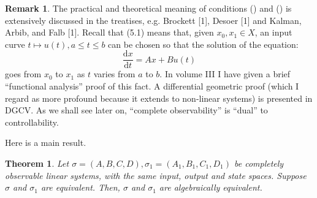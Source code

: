 \documentclass[12pt]{book}
\theoremstyle{plain}
\newtheorem{theorem}{Theorem}[section]
\theoremstyle{definition}
\newtheorem*{remark}{Remark}
\newcommand{\dd}[1]{\mathrm{d}#1}
\begin{document}
\begin{remark}
    The practical and theoretical meaning of conditions () and () is extensively discussed in the treatises, e.g. Brockett [1], Desoer [1] and Kalman, Arbib, and Falb [1]. %
    Recall that (5.1) means that, given $x_0, x_1 \in X$, an input curve $t \mapsto u(t), a \leq t \leq b$ can be chosen so that the solution of the equation: %
    $$\frac{\dd{x}}{\dd{t}} = Ax + Bu(t)$$
    goes from $x_0$ to $x_1$ as $t$ varies from $a$ to $b$.
    In volume III I have given a brief ``functional analysis'' proof of this fact.
    A differential geometric proof (which I regard as more profound because it extends to non-linear systems) is presented in DGCV.
    As we shall see later on, ``complete observability'' is ``dual'' to controllability.
\end{remark}

Here is a main result.

\begin{theorem} \label{thm:Equivalence2}
    Let $\sigma = (A, B, C, D), \sigma_1 = (A_1, B_1, C_1, D_1)$ be completely observable linear systems, with the same input, output and state spaces.
    Suppose $\sigma$ and $\sigma_1$ are equivalent. Then, $\sigma$ and $\sigma_1$ are algebraically equivalent.
\end{theorem}
\end{document}
